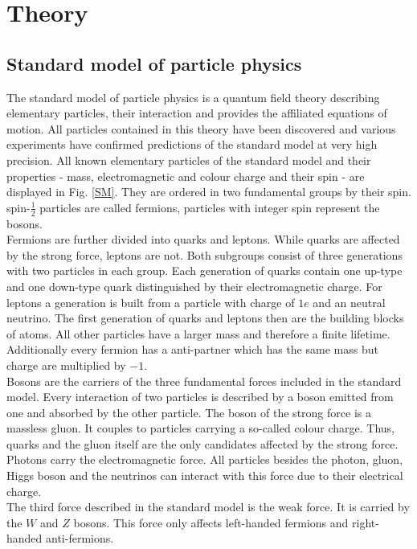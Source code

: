 \chapter{Theory}
\section{Standard model of particle physics}
	The standard model of particle physics is a quantum field theory describing elementary particles, their interaction and provides the affiliated equations of motion. All particles contained in this theory have been discovered and various experiments have confirmed predictions of the standard model at very high precision. All known elementary particles of the standard model and their properties - mass, electromagnetic and colour charge and their spin - are displayed in Fig. \ref{SM}. They are ordered in two fundamental groups by their spin. spin-$\frac{1}{2}$ particles are called fermions, particles with integer spin represent the bosons. 
	\\
	Fermions are further divided into quarks and leptons. While quarks are affected by the strong force, leptons are not. Both subgroups consist of three generations with two particles in each group. Each generation of quarks contain one up-type and one down-type quark distinguished by their electromagnetic charge. For leptons a generation is built from a particle with charge of $1e$ and an neutral neutrino. The first generation of quarks and leptons then are the building blocks of atoms. All other particles have a larger mass and therefore a finite lifetime. Additionally every fermion has a anti-partner which has the same mass but charge are multiplied by $-1$. 
	\\	
	Bosons are the carriers of the three fundamental forces included in the standard model. Every interaction of two particles is described by a boson emitted from one and absorbed by the other particle. The boson of the strong force is a massless gluon. It couples to particles carrying a so-called colour charge. Thus, quarks and the gluon itself are the only candidates affected by the strong force. 
	\\	
	Photons carry the electromagnetic force. All particles besides the photon, gluon, Higgs boson and the neutrinos can interact with this force due to their electrical charge. 
	\\
	The third force described in the standard model is the weak force. It is carried by the $W$ and $Z$ bosons. This force only affects left-handed fermions and right-handed anti-fermions. 

